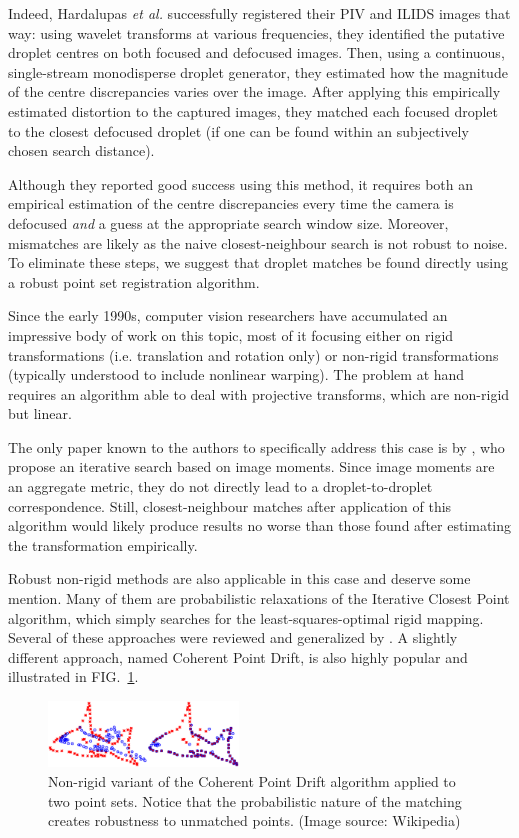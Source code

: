 \documentclass[floatfix,aip,rsi,reprint,graphicx]{revtex4-1}
\begin{document}
Indeed, Hardalupas \emph{et al.} successfully registered their PIV and ILIDS
images that way: using wavelet transforms at various frequencies, they
identified the putative droplet centres on both focused and defocused images.
Then, using a continuous, single-stream monodisperse droplet generator, they
estimated how the magnitude of the centre discrepancies varies over the image.
After applying this empirically estimated distortion to the captured images,
they matched each focused droplet to the closest defocused droplet (if one can
be found within an subjectively chosen search distance).

Although they reported good success using this method, it requires both an
empirical estimation of the centre discrepancies every time the camera is
defocused \emph{and} a guess at the appropriate search window size. Moreover,
mismatches are likely as the naive closest-neighbour search is not robust to
noise. To eliminate these steps, we suggest that droplet matches be found
directly using a robust point set registration algorithm.

Since the early 1990s, computer vision researchers have accumulated an
impressive body of work on this topic, most of it focusing either
on rigid transformations (i.e. translation and rotation only) or non-rigid
transformations (typically understood to include nonlinear warping). The problem
at hand requires an algorithm able to deal with projective transforms, which
are non-rigid but linear.

The only paper known to the authors to specifically address this case is by
\citet{Chi11}, who propose an iterative search based on image moments. Since
image moments are an aggregate metric, they do not directly lead to a
droplet-to-droplet correspondence. Still, closest-neighbour matches after
application of this algorithm would likely produce results no worse than those
found after estimating the transformation empirically.

Robust non-rigid methods are also applicable in this case and deserve some
mention. Many of them are probabilistic relaxations of the Iterative Closest
Point algorithm, which simply searches for the least-squares-optimal rigid
mapping. Several of these approaches were reviewed and generalized by
\citet{Jian10}. A slightly different approach, named Coherent Point
Drift\cite{Myronenko10}, is also highly popular and illustrated in FIG.~\ref{fig:cpd}.
\begin{figure}
    \centering
    \includegraphics[width=0.45\textwidth]{orb_images/pointset.eps}
    \caption{Non-rigid variant of the Coherent Point Drift algorithm applied to
    two point sets. Notice that the probabilistic nature of the matching creates
robustness to unmatched points. (Image source: Wikipedia)}
    \label{fig:cpd}
\end{figure}
\end{document}
